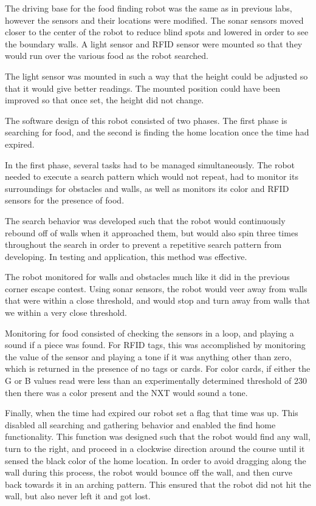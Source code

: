 \documentclass[journal]{IEEEtran}
\begin{document}
The driving base for the food finding robot was the same as in previous labs, however the sensors and their locations were modified. The sonar sensors moved closer to the center of the robot to reduce blind spots and lowered in order to see the boundary walls. A light sensor and RFID sensor were mounted so that they would run over the various food as the robot searched.

The light sensor was mounted in such a way that the height could be adjusted so that it would give better readings. The mounted position could have been improved so that once set, the height did not change.

The software design of this robot consisted of two phases. The first phase is searching for food, and the second is finding the home location once the time had expired.

In the first phase, several tasks had to be managed simultaneously. The robot needed to execute a search pattern which would not repeat, had to monitor its surroundings for obstacles and walls, as well as monitors its color and RFID sensors for the presence of food.

The search behavior was developed such that the robot would continuously rebound off of walls when it approached them, but would also spin three times throughout the search in order to prevent a repetitive search pattern from developing. In testing and application, this method was effective.

The robot monitored for walls and obstacles much like it did in the previous corner escape contest. Using sonar sensors, the robot would veer away from walls that were within a close threshold, and would stop and turn away from walls that we within a very close threshold.

Monitoring for food consisted of checking the sensors in a loop, and playing a sound if a piece was found. For RFID tags, this was accomplished by monitoring the value of the sensor and playing a tone if it was anything other than zero, which is returned in the presence of no tags or cards. For color cards, if either the G or B values read were less than an experimentally determined threshold of 230 then there was a color present and the NXT would sound a tone.

Finally, when the time had expired our robot set a flag that time was up. This disabled all searching and gathering behavior and enabled the find home functionality. This function was designed such that the robot would find any wall, turn to the right, and proceed in a clockwise direction around the course until it sensed the black color of the home location. In order to avoid dragging along the wall during this process, the robot would bounce off the wall, and then curve back towards it in an arching pattern. This ensured that the robot did not hit the wall, but also never left it and got lost.
\end{document}
